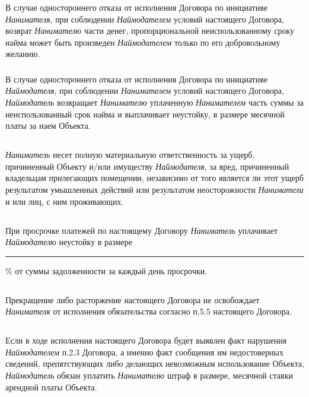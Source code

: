 \documentclass[a4paper, 11pt]{article}
\begin{document}
\subsubsection{} В случае одностороннего отказа от исполнения Договора по инициативе
\textit{Нанимателя}, при соблюдении \textit{Наймодателем} условий настоящего Договора, возврат
\textit{Нанимателю} части денег, пропорциональной неиспользованному сроку найма может
быть произведен \textit{Наймодателем} только по его добровольному желанию.
\subsubsection{} В случае одностороннего отказа от исполнения Договора по инициативе
\textit{Наймодателя}, при соблюдении \textit{Нанимателем} условий настоящего
Договора, \textit{Наймодатель}
возвращает \textit{Нанимателю} уплаченную \textit{Нанимателем} часть суммы за неиспользованный
срок найма и выплачивает неустойку, в размере месячной платы за наем Объекта.
\subsection{} \textit{Наниматель} несет полную материальную ответственность за ущерб, причиненный
Объекту и/или имуществу \textit{Наймодателя}, за вред, причиненный владельцам прилегающих
помещении, независимо от того является ли этот ущерб результатом умышленных
действий или результатом неосторожности \textit{Наниматели} и или лиц, с ним проживающих.
\subsection{} При просрочке платежей по настоящему Договору \textit{Наниматель} уплачивает
\textit{Наймодателю} неустойку в размере \rule{4cm}{0.5pt}\% от суммы задолженности за каждый день
просрочки.
\subsection{} Прекращение либо расторжение настоящего Договора не освобождает
\textit{Нанимателя}
от исполнения обязательства согласно п.5.5 настоящего Договора.
\subsection{} Если в ходе исполнения настоящего Договора будет выявлен факт нарушения
\textit{Наймодателем} п.2.3 Договора, а именно факт сообщения им недостоверных сведений,
препятствующих либо делающих невозможным использование Объекта,
\textit{Наймодатель}
обязан уплатить \textit{Нанимателю} штраф в размере, месячной ставки арендной платы
Объекта.
\end{document}

